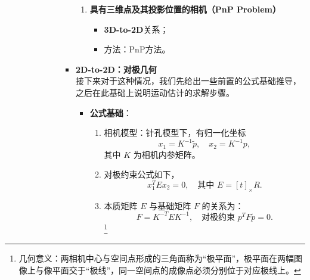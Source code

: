 \documentclass[../main.tex]{subfiles}
\begin{document}
\begin{enumerate}
\begin{itemize}
\begin{enumerate}
\begin{itemize}
\begin{itemize}
\begin{enumerate}
            \item \textbf{具有三维点及其投影位置的相机（PnP Problem）}
            \begin{itemize}
                \item \textbf{3D-to-2D}关系；
                \item 方法：PnP方法。
            \end{itemize}
        \end{enumerate}

        \item \textbf{2D-to-2D：对极几何}
        \\接下来对于这种情况，我们先给出一些前置的公式基础推导，之后在此基础上说明运动估计的求解步骤。
        \begin{itemize}
            \item \textbf{公式基础}：
                \begin{enumerate}

                    \item 相机模型：针孔模型下，有归一化坐标
                    \[
                    x_1 = K^{-1} \tilde{p}, \quad x_2 = K^{-1} p,
                    \]
                    其中 $K$ 为相机内参矩阵。
                    \item 对极约束公式如下，
                    \[
                    x_1^T E x_2 = 0, \quad \text{其中 } E = [t]_\times R.
                    \]
                    \item 本质矩阵 $E$ 与基础矩阵 $F$ 的关系为：
                    \[
                    F = K^{-T} E K^{-1}, \quad \text{对极约束 } p^T F \tilde{p} = 0.
                    \]
                    \footnote{几何意义：两相机中心与空间点形成的三角面称为“极平面”，极平面在两幅图像上与像平面交于“极线”，同一空间点的成像点必须分别位于对应极线上。}
            \end{enumerate}


\end{itemize}
\end{itemize}
\end{itemize}
\end{enumerate}
\end{itemize}
\end{enumerate}
\end{document}
